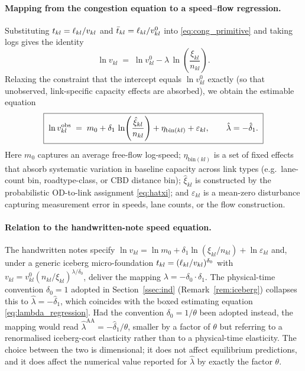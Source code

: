 \paragraph{Mapping from the congestion equation to a speed--flow
regression.}
Substituting $t_{kl}=\ell_{kl}/v_{kl}$ and $\bar t_{kl}=\ell_{kl}/v^{0}_{kl}$
into \eqref{eq:cong_primitive} and taking logs gives the identity
\begin{equation}\label{eq:speed_identity}
  \ln v_{kl}
  \;=\;
  \ln v^{0}_{kl}
  -\lambda\,\ln\!\left(\frac{\xi_{kl}}{n_{kl}}\right).
\end{equation}
Relaxing the constraint that the intercept equals $\ln v^{0}_{kl}$
exactly (so that unobserved, link-specific capacity effects are
absorbed), we obtain the estimable equation
\begin{equation}\label{eq:lambda_regression}
  \boxed{\;
  \ln v_{kl}^{\mathrm{obs}}
  \;=\;
  m_0
  +\delta_1\,\ln\!\left(\frac{\hat\xi_{kl}}{n_{kl}}\right)
  +\eta_{\mathrm{bin}(kl)}
  +\varepsilon_{kl},
  \qquad
  \hat\lambda=-\hat\delta_1.
  \;}
\end{equation}
Here $m_0$ captures an average free-flow log-speed; $\eta_{\mathrm{bin}(kl)}$
is a set of fixed effects that absorb systematic variation in
baseline capacity across link types (e.g.\ lane-count bin,
roadtype-class, or CBD distance bin); $\hat\xi_{kl}$ is constructed
by the probabilistic OD-to-link assignment \eqref{eq:hatxi}; and
$\varepsilon_{kl}$ is a mean-zero disturbance capturing measurement
error in speeds, lane counts, or the flow construction.

\paragraph{Relation to the handwritten-note speed equation.}
The handwritten notes specify
$\ln v_{kl}=\ln m_0+\delta_1\ln(\xi_{kl}/n_{kl})+\ln\varepsilon_{kl}$
and, under a generic iceberg micro-foundation
$t_{kl}=(\ell_{kl}/v_{kl})^{\delta_0}$ with
$v_{kl}=v^{0}_{kl}(n_{kl}/\xi_{kl})^{\lambda/\delta_0}$, deliver the
mapping $\lambda=-\delta_0\cdot\delta_1$.  The physical-time
convention $\delta_0=1$ adopted in Section~\ref{ssec:ind}
(Remark~\ref{rem:iceberg}) collapses this to
$\hat\lambda=-\hat\delta_1$, which coincides with the boxed
estimating equation \eqref{eq:lambda_regression}.  Had the
\cite{AllenArkolakis2022} convention $\delta_0=1/\theta$ been adopted
instead, the mapping would read $\hat\lambda^{\mathrm{AA}}
=-\hat\delta_1/\theta$, smaller by a factor of $\theta$ but referring
to a renormalised iceberg-cost elasticity rather than to a
physical-time elasticity.  The choice between the two is dimensional;
it does not affect equilibrium predictions, and it does affect the
numerical value reported for $\hat\lambda$ by exactly the factor
$\theta$.

